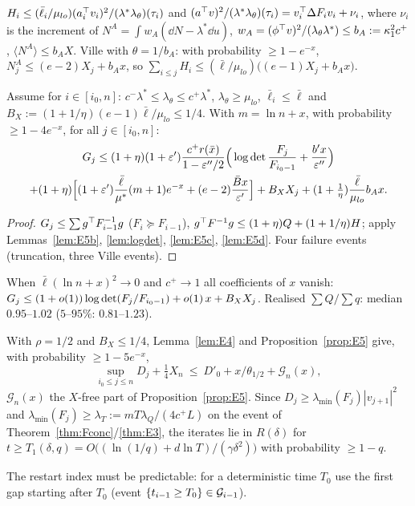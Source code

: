 \begin{lemma}\label{lem:E5d}\Pt{}
$H_i\le(\bar\ell_i/\mu_{lo})(a_i^{\top} v_i)^2/(\lambda^*\lambda_\theta)(\tau_i)$ and $(a^{\top} v)^2/(\lambda^*\lambda_\theta)(\tau_i)=v_i^{\top}\Delta F_iv_i+\nu_i$, where $\nu_i$ is the increment of $N^A=\int w_A(\dd N-\lambda^*\dd u)$, $w_A=(\phi^{\top} v)^2/(\lambda_\theta\lambda^*)\le b_A:=\kappa_1^2c^+$, $\langle N^A\rangle\le b_AX$. Ville with $\theta=1/b_A$: with probability $\ge1-e^{-x}$, $N^A_j\le(e-2)X_j+b_Ax$, so
$\sum_{i\le j}H_i\le(\bar\ell/\mu_{lo})\big((e-1)X_j+b_Ax\big)$.
\end{lemma}

\begin{proposition}\label{prop:E5}\Pt{}
Assume for $i\in[i_0,n]$: $c^-\lambda^*\le\lambda_\theta\le c^+\lambda^*$, $\lambda_\theta\ge\mu_{lo}$, $\bar\ell_i\le\bar\ell$ and $B_X:=(1+1/\eta)(e-1)\bar\ell/\mu_{lo}\le1/4$. With $m=\ln n+x$, with probability $\ge1-4e^{-x}$, for all $j\in[i_0,n]$:
\begin{multline*}
G_j\le(1+\eta)(1+\varepsilon')\frac{c^+r(\bar x)}{1-\varepsilon''/2}\Big(\log\det\frac{F_j}{F_{i_0-1}}+\frac{b'x}{\varepsilon''}\Big)\\
+(1+\eta)\Big[(1+\varepsilon')\frac{\bar\ell}{\mu^*}(m+1)e^{-x}+(e-2)\frac{\bar Bx}{\varepsilon'}\Big]+B_XX_j+(1+\tfrac1\eta)\frac{\bar\ell}{\mu_{lo}}b_Ax.
\end{multline*}
\end{proposition}
\begin{proof}
$G_j\le\sum g^{\top} F_{i-1}^{-1}g$ ($F_i\succeq F_{i-1}$), $g^{\top} F^{-1}g\le(1+\eta)Q+(1+1/\eta)H$; apply Lemmas~\ref{lem:E5b}, \ref{lem:logdet}, \ref{lem:E5c}, \ref{lem:E5d}. Four failure events (truncation, three Ville events).
\end{proof}
When $\bar\ell(\ln n+x)^2\to0$ and $c^+\to1$ all coefficients of $x$ vanish: $G_j\le(1+o(1))\log\det(F_j/F_{i_0-1})+o(1)\,x+B_XX_j$.
Realised $\sum Q/\sum q$: median $0.95$--$1.02$ ($5$--$95\%$: $0.81$--$1.23$).

\begin{theorem}\label{thm:Cexp}\Ps{}
With $\rho=1/2$ and $B_X\le1/4$, Lemma~\ref{lem:E4} and Proposition~\ref{prop:E5} give, with probability $\ge1-5e^{-x}$,
\[
\sup_{i_0\le j\le n}D_j+\tfrac14X_n\ \le\ D'_0+x/\theta_{1/2}+\mathcal G_n(x),
\]
$\mathcal G_n(x)$ the $X$-free part of Proposition~\ref{prop:E5}. Since $D_j\ge\lambda_{\min}(F_j)|v_{j+1}|^2$ and $\lambda_{\min}(F_j)\ge\lambda_T:=mT\lambda_Q/(4c^+L)$ on the event of Theorem~\ref{thm:Fconc}/\ref{thm:E3}, the iterates lie in $R(\delta)$ for $t\ge T_1(\delta,q)=O\!\big((\ln(1/q)+d\ln T)/(\gamma\delta^2)\big)$ with probability $\ge1-q$.
\end{theorem}
The restart index must be predictable: for a deterministic time $T_0$ use the first gap starting after $T_0$ (event $\{t_{i-1}\ge T_0\}\in\mathcal G_{i-1}$).

